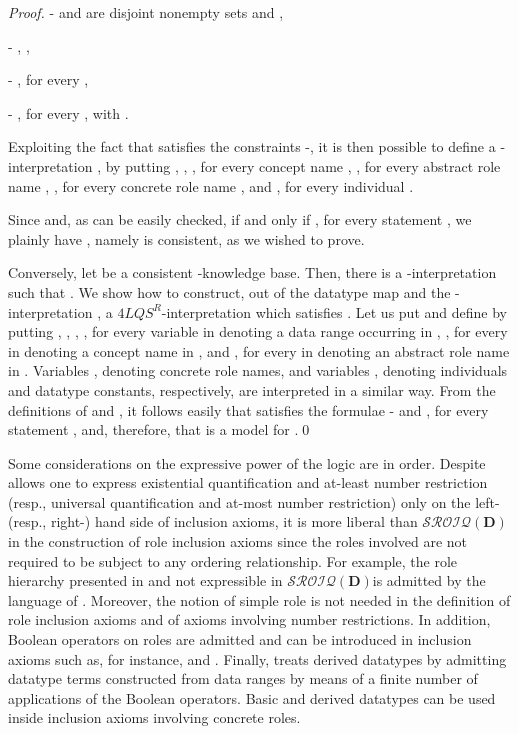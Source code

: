 \documentclass[a4paper]{llncs}
\newcommand{\sroiqd}{\ensuremath{\mathcal{SROIQ}(\D)}}
\newcommand{\flqsr}{\ensuremath{4LQS^R}}
\newcommand{\D}{\mathbf{D}}
\begin{document}
\begin{proof}
\medskip
-  and  are disjoint nonempty sets and ,

- , ,

- , for every ,

- , for every , with .

\smallskip
\noindent
Exploiting the fact that  satisfies the constraints -, it is then possible to define a -interpretation , by putting , , , for every concept name , , for every abstract role name , , for every concrete role name , and , for every individual .

Since  and, as can be easily checked,  if and only if , for every statement , we plainly have , namely  is consistent, as we wished to prove.

Conversely, let  be a consistent -knowledge base. Then, there is a -interpretation  such that . We show how to construct, out of the datatype map  and the -interpretation , a \flqsr-interpretation  which satisfies . Let us put  and define  by putting , ,  , , for every variable  in  denoting a data range  occurring in , , for every  in  denoting a concept name in , and , for every  in  denoting an abstract role name in . Variables , denoting concrete role names, and variables , denoting individuals and datatype constants, respectively, are interpreted in a similar way. From the definitions of  and , it follows easily that   satisfies the formulae - and , for every statement , and, therefore, that  is a model for .\qed
\end{proof}

Some considerations on the expressive power of the logic  are in order. Despite  allows one to express existential quantification and at-least number restriction (resp., universal quantification and at-most number restriction) only on the left- (resp., right-) hand side of inclusion axioms, it is more liberal than \sroiqd\space
in the construction of role inclusion axioms since the roles involved are not required to be subject to any ordering relationship. For example, the role hierarchy  presented in \cite{Horrocks2006} and not expressible in \sroiqd\space is admitted by the language of . Moreover, the notion of simple role is not needed in the definition of role inclusion axioms and of axioms involving number restrictions. In addition, Boolean operators on roles are admitted and can be introduced in inclusion axioms such as, for instance,  and . Finally,  treats derived datatypes by admitting datatype terms constructed from data ranges by means of a finite number of applications of the Boolean operators. Basic and derived datatypes can be used inside inclusion axioms involving concrete roles.
\end{document}
